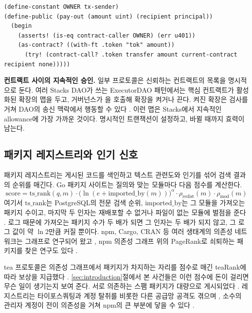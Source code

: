 \begin{lstlisting}[language=Clarity,caption={Clarity~4의 자산 한도. 볼트 소유자만 지급을 시작할 수 있고, 본문이 실행되는 동안 볼트에서 나갈 수 있는 토큰은 최대 \code{amount}이다.},label={lst:as-contract},float=htbp]
(define-constant OWNER tx-sender)
(define-public (pay-out (amount uint) (recipient principal))
  (begin
    (asserts! (is-eq contract-caller OWNER) (err u401))
    (as-contract? ((with-ft .token "tok" amount))
      (try! (contract-call? .token transfer amount current-contract recipient none)))))
\end{lstlisting}

\textbf{컨트랙트 사이의 지속적인 승인.} 일부 프로토콜은 신뢰하는 컨트랙트의 목록을 명시적으로 둔다. 여러 Stacks DAO가 쓰는 ExecutorDAO 패턴에서는 핵심 컨트랙트가 활성화된 확장의 맵을 두고, 거버넌스가 을 호출해 확장을 켜거나 끈다. 켜진 확장은  검사를 거쳐 DAO의 송신 맥락에서 행동할 수 있다 \cite{executordao}. 이런 맵은 Stacks에서 지속적인 allowance에 가장 가까운 것이다. 명시적인 트랜잭션이 설정하고, 바뀔 때까지 효력이 남는다.

\subsection{패키지 레지스트리와 인기 신호}
\label{sec:bg-registries}

패키지 레지스트리는 게시된 코드를 색인하고 텍스트 관련도와 인기를 섞어 검색 결과의 순위를 매긴다. Go 패키지 사이트는 질의와 맞는 모듈마다 다음 점수를 계산한다.
\begin{equation}
\label{eq:pkgsite}
\mathrm{score} = \mathrm{ts\_rank}(q,m)\cdot\bigl(\ln(e + \mathrm{imported\_by}(m))\bigr)^{\alpha}\cdot\rho_{\mathrm{redist}}(m)\cdot\rho_{\mathrm{mod}}(m)
\end{equation}
여기서 $\mathrm{ts\_rank}$는 PostgreSQL의 전문 검색 순위, $\mathrm{imported\_by}$는 그 모듈을 가져오는 패키지 수이고, 마지막 두 인자는 재배포할 수 없거나  파일이 없는 모듈에 벌점을 준다 \cite{pkgsite}. 로그 때문에 가져오는 패키지 수가 두 배가 되면 그 인자는 두 배가 되지 않고, 그 로그 값이 약 $\ln 2$만큼 커질 뿐이다. npm, Cargo, CRAN 등 여러 생태계의 의존성 네트워크는 그래프로 연구되어 왔고 \cite{kikas2017structure,decan2019empirical}, npm 의존성 그래프 위의 PageRank로 쇠퇴하는 패키지를 찾은 연구도 있다 \cite{mujahid2021centrality}.

tea 프로토콜은 의존성 그래프에서 패키지가 차지하는 자리를 점수로 매긴 teaRank에 따라 보상을 지급했다 \cite{tea2022}. \ref{sec:introduction}절에서 본 사건들은 이런 점수에 돈이 걸리면 무슨 일이 생기는지 보여 준다. 서로 의존하는 스팸 패키지가 대량으로 게시되었다 \cite{sonatype2024tea,aws2025tea}. 레지스트리는 타이포스쿼팅과 계정 탈취를 비롯한 다른 공급망 공격도 겪으며 \cite{ohm2020backstabber,ladisa2023sok,vu2020typosquatting}, 소수의 관리자 계정이 전이 의존성을 거쳐 npm의 큰 부분에 닿을 수 있다 \cite{zimmermann2019small}.

